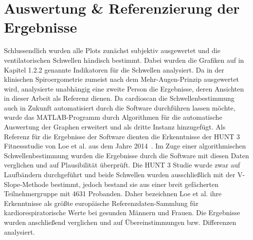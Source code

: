 \section{Auswertung \& Referenzierung der Ergebnisse}
%
Schlussendlich wurden alle Plots zunächst subjektiv ausgewertet und die ventilatorischen Schwellen händisch bestimmt. Dabei wurden die Grafiken auf in Kapitel 1.2.2 genannte Indikatoren für die Schwellen analysiert. Da in der klinischen Spiroergometrie zumeist nach dem Mehr-Augen-Prinzip ausgewertet wird, analysierte unabhängig eine zweite Person die Ergebnisse, deren Ansichten in dieser Arbeit als Referenz dienen. Da cardioscan die Schwellenbestimmung auch in Zukunft automatisiert durch die Software durchführen lassen möchte, wurde das MATLAB-Programm durch Algorithmen für die automatische Auswertung der Graphen erweitert und als dritte Instanz hinzugefügt. Als Referenz für die Ergebnisse der Software dienten die Erkenntnisse der HUNT 3 Fitnessstudie von Loe et al. aus dem Jahre 2014~\cite{Loe.2014}. Im Zuge einer algorithmischen Schwellenbestimmung wurden die Ergebnisse durch die Software mit diesen Daten verglichen und auf Plausibilität überprüft. Die HUNT 3 Studie wurde zwar auf Laufbändern durchgeführt und beide Schwellen wurden ausschließlich mit der V-Slope-Methode bestimmt, jedoch bestand sie aus einer breit gefächerten Teilnehmergruppe mit 4631 Probanden. Daher bezeichnen Loe et al. ihre Erkenntnisse als größte europäische Referenzdaten-Sammlung für kardiorespiratorische Werte bei gesunden Männern und Frauen. Die Ergebnisse wurden anschließend verglichen und auf Übereinstimmungen bzw. Differenzen analysiert.
%
